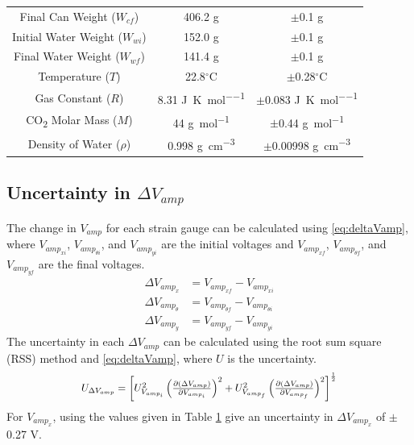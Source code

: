 \documentclass[10pt,journal,letterpaper]{IEEEtran}
\begin{document}
\begin{table}[H]
{\begin{tabular}{ccc}
Final Can Weight ($W_{cf}$) & 406.2 g & $\pm$0.1 g \\
Initial Water Weight ($W_{wi}$) & 152.0 g & $\pm$0.1 g \\
Final Water Weight ($W_{wf}$) & 141.4 g & $\pm$0.1 g \\
Temperature ($T$) & 22.8$^\circ$C & $\pm$0.28$^\circ$C \\
Gas Constant ($R$) \cite{b6} & 8.31 \unit{\joule\per\kelvin\per\mole} & $\pm$0.083 \unit{\joule\per\kelvin\per\mole} \\
CO\textsubscript{2} Molar Mass ($M$) \cite{b4} & 44 \unit{\gram\per\mole} & $\pm$0.44 \unit{\gram\per\mole} \\
Density of Water ($\rho$) \cite{b7} & 0.998 \unit{\gram\per\centi\meter\cubed} & $\pm$0.00998 \unit{\gram\per\centi\meter\cubed} \\
\hline \hline
\end{tabular}}
\label{tab:Uncertainty}
\end{table}

\subsection*{Uncertainty in $\Delta V_{amp}$}

The change in $V_{amp}$ for each strain gauge can be calculated using \eqref{eq:deltaVamp}, where $V_{amp_{xi}}$, $V_{amp_{\theta i}}$, and $V_{amp_{yi}}$ are the initial voltages and $V_{amp_{xf}}$, $V_{amp_{\theta f}}$, and $V_{amp_{yf}}$ are the final voltages.
\begin{subequations}
\label{eq:deltaVamp}
\begin{align}
\Delta V_{amp_{x}}&=V_{amp_{xf}}-V_{amp_{xi}} \\
\Delta V_{amp_{\theta}}&=V_{amp_{\theta f}}-V_{amp_{\theta i}} \\
\Delta V_{amp_{y}}&=V_{amp_{yf}}-V_{amp_{yi}}
\end{align}
\end{subequations}
The uncertainty in each $\Delta V_{amp}$ can be calculated using the root sum square (RSS) method and \eqref{eq:deltaVamp}, where $U$ is the uncertainty.
\begin{equation}
\label{eq:UDeltaVamp}
\resizebox{227pt}{!}{$U_{\Delta V_{amp}}=\left[U_{V_{amp_{i}}}^2 \left(\frac{\partial (\Delta V_{amp})}{\partial V_{amp_{i}}}\right)^2 + U_{V_{amp_{f}}}^2 \left(\frac{\partial (\Delta V_{amp})}{\partial V_{amp_{f}}}\right)^2 \right]^{\frac{1}{2}}$}
\end{equation}
For $V_{amp_{x}}$, using the values given in Table \ref{tab:Uncertainty} give an uncertainty in $\Delta V_{amp_{x}}$ of $\pm$0.27 V.
\end{document}
